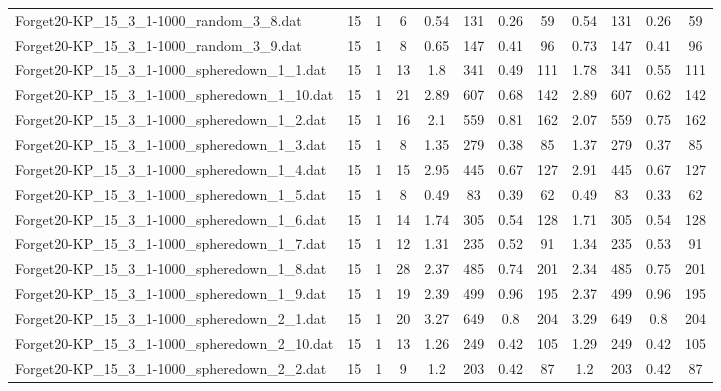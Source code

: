 \begin{sidewaystable}[!ht]
{\begin{tabular}{lccccccccccc}
Forget20-KP\_15\_3\_1-1000\_random\_3\_8.dat & 15 & 1 & 6 & 0.54 & 131 &  \textcolor{blue2}{0.26} & 59 & 0.54 & 131 &  \textcolor{blue2}{0.26} & 59 \\
Forget20-KP\_15\_3\_1-1000\_random\_3\_9.dat & 15 & 1 & 8 & 0.65 & 147 &  \textcolor{blue2}{0.41} & 96 & 0.73 & 147 &  \textcolor{blue2}{0.41} & 96 \\
Forget20-KP\_15\_3\_1-1000\_spheredown\_1\_1.dat & 15 & 1 & 13 & 1.8 & 341 &  \textcolor{blue2}{0.49} & 111 & 1.78 & 341 & 0.55 & 111 \\
Forget20-KP\_15\_3\_1-1000\_spheredown\_1\_10.dat & 15 & 1 & 21 & 2.89 & 607 & 0.68 & 142 & 2.89 & 607 &  \textcolor{blue2}{0.62} & 142 \\
Forget20-KP\_15\_3\_1-1000\_spheredown\_1\_2.dat & 15 & 1 & 16 & 2.1 & 559 & 0.81 & 162 & 2.07 & 559 &  \textcolor{blue2}{0.75} & 162 \\
Forget20-KP\_15\_3\_1-1000\_spheredown\_1\_3.dat & 15 & 1 & 8 & 1.35 & 279 & 0.38 & 85 & 1.37 & 279 &  \textcolor{blue2}{0.37} & 85 \\
Forget20-KP\_15\_3\_1-1000\_spheredown\_1\_4.dat & 15 & 1 & 15 & 2.95 & 445 &  \textcolor{blue2}{0.67} & 127 & 2.91 & 445 &  \textcolor{blue2}{0.67} & 127 \\
Forget20-KP\_15\_3\_1-1000\_spheredown\_1\_5.dat & 15 & 1 & 8 & 0.49 & 83 & 0.39 & 62 & 0.49 & 83 &  \textcolor{blue2}{0.33} & 62 \\
Forget20-KP\_15\_3\_1-1000\_spheredown\_1\_6.dat & 15 & 1 & 14 & 1.74 & 305 &  \textcolor{blue2}{0.54} & 128 & 1.71 & 305 &  \textcolor{blue2}{0.54} & 128 \\
Forget20-KP\_15\_3\_1-1000\_spheredown\_1\_7.dat & 15 & 1 & 12 & 1.31 & 235 &  \textcolor{blue2}{0.52} & 91 & 1.34 & 235 & 0.53 & 91 \\
Forget20-KP\_15\_3\_1-1000\_spheredown\_1\_8.dat & 15 & 1 & 28 & 2.37 & 485 &  \textcolor{blue2}{0.74} & 201 & 2.34 & 485 & 0.75 & 201 \\
Forget20-KP\_15\_3\_1-1000\_spheredown\_1\_9.dat & 15 & 1 & 19 & 2.39 & 499 &  \textcolor{blue2}{0.96} & 195 & 2.37 & 499 &  \textcolor{blue2}{0.96} & 195 \\
Forget20-KP\_15\_3\_1-1000\_spheredown\_2\_1.dat & 15 & 1 & 20 & 3.27 & 649 & 0.8 & 204 & 3.29 & 649 & 0.8 & 204 \\
Forget20-KP\_15\_3\_1-1000\_spheredown\_2\_10.dat & 15 & 1 & 13 & 1.26 & 249 &  \textcolor{blue2}{0.42} & 105 & 1.29 & 249 &  \textcolor{blue2}{0.42} & 105 \\
Forget20-KP\_15\_3\_1-1000\_spheredown\_2\_2.dat & 15 & 1 & 9 & 1.2 & 203 &  \textcolor{blue2}{0.42} & 87 & 1.2 & 203 &  \textcolor{blue2}{0.42} & 87 \\

\end{tabular}}
\end{sidewaystable}
